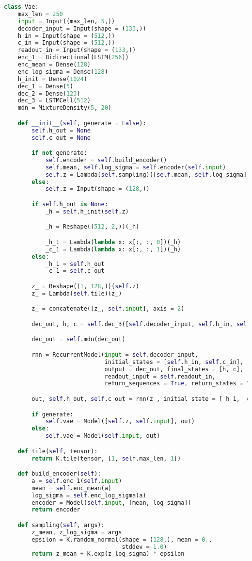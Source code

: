 \begin{lstlisting}[language = Python, frame = single, caption = {Il modello completo del VAE, composto da LSTM}, captionpos = b]
	class Vae:
    max_len = 250
    input = Input((max_len, 5,))
    decoder_input = Input(shape = (133,))
    h_in = Input(shape = (512,))
    c_in = Input(shape = (512,))
    readout_in = Input(shape = (133,))
    enc_1 = Bidirectional(LSTM(256))
    enc_mean = Dense(128)
    enc_log_sigma = Dense(128)
    h_init = Dense(1024)
    dec_1 = Dense(5)
    dec_2 = Dense(123)
    dec_3 = LSTMCell(512)
    mdn = MixtureDensity(5, 20)

    def __init__(self, generate = False):
        self.h_out = None
        self.c_out = None

        if not generate:
            self.encoder = self.build_encoder()
            self.mean, self.log_sigma = self.encoder(self.input)
            self.z = Lambda(self.sampling)([self.mean, self.log_sigma])
        else:
            self.z = Input(shape = (128,))

        if self.h_out is None:
            _h = self.h_init(self.z)

            _h = Reshape((512, 2,))(_h)

            _h_1 = Lambda(lambda x: x[:, :, 0])(_h)
            _c_1 = Lambda(lambda x: x[:, :, 1])(_h)
        else:
            _h_1 = self.h_out
            _c_1 = self.c_out

        z_ = Reshape((1, 128,))(self.z)
        z_ = Lambda(self.tile)(z_)

        z_ = concatenate([z_, self.input], axis = 2)

        dec_out, h, c = self.dec_3([self.decoder_input, self.h_in, self.c_in])

        dec_out = self.mdn(dec_out)

        rnn = RecurrentModel(input = self.decoder_input,
                             initial_states = [self.h_in, self.c_in],
                             output = dec_out, final_states = [h, c],
                             readout_input = self.readout_in,
                             return_sequences = True, return_states = True)

        out, self.h_out, self.c_out = rnn(z_, initial_state = [_h_1, _c_1])

        if generate:
            self.vae = Model([self.z, self.input], out)
        else:
            self.vae = Model(self.input, out)

    def tile(self, tensor):
        return K.tile(tensor, [1, self.max_len, 1])

    def build_encoder(self):
        a = self.enc_1(self.input)
        mean = self.enc_mean(a)
        log_sigma = self.enc_log_sigma(a)
        encoder = Model(self.input, [mean, log_sigma])
        return encoder

    def sampling(self, args):
        z_mean, z_log_sigma = args
        epsilon = K.random_normal(shape = (128,), mean = 0.,
                                  stddev = 1.0)
        return z_mean + K.exp(z_log_sigma) * epsilon
\end{lstlisting}
\newpage

